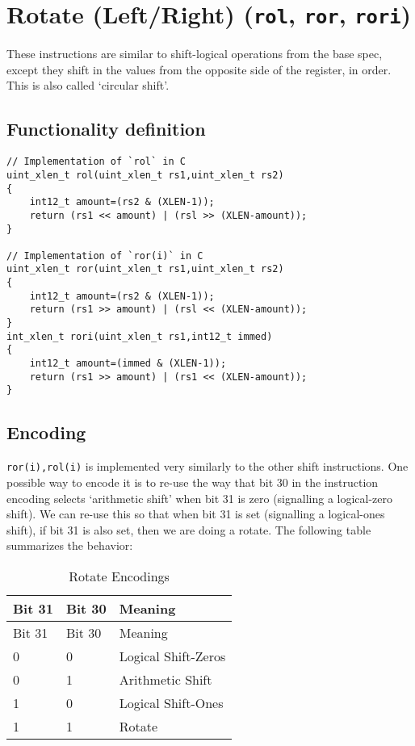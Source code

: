 
\section{Rotate (Left/Right) (\texttt{rol}, \texttt{ror}, \texttt{rori})}

These instructions are similar to shift-logical operations from the base
spec, except they shift in the values from the opposite side of the
register, in order. This is also called `circular shift'.

\subsection{Functionality definition}

\begin{verbatim}
// Implementation of `rol` in C
uint_xlen_t rol(uint_xlen_t rs1,uint_xlen_t rs2)
{
    int12_t amount=(rs2 & (XLEN-1));
    return (rs1 << amount) | (rsl >> (XLEN-amount));
}   

// Implementation of `ror(i)` in C
uint_xlen_t ror(uint_xlen_t rs1,uint_xlen_t rs2)
{
    int12_t amount=(rs2 & (XLEN-1));
    return (rs1 >> amount) | (rsl << (XLEN-amount));
}
int_xlen_t rori(uint_xlen_t rs1,int12_t immed)
{
    int12_t amount=(immed & (XLEN-1));
    return (rs1 >> amount) | (rs1 << (XLEN-amount));
}
\end{verbatim}

\subsection{Encoding}



\texttt{ror(i),rol(i)} is implemented very similarly to the other shift
instructions. One possible way to encode it is to re-use the way that
bit 30 in the instruction encoding selects `arithmetic shift' when bit
31 is zero (signalling a logical-zero shift). We can re-use this so that
when bit 31 is set (signalling a logical-ones shift), if bit 31 is also
set, then we are doing a rotate. The following table summarizes the
behavior:

\begin{longtable}[c]{@{}lll@{}}
\caption{Rotate Encodings}\tabularnewline
\toprule
Bit 31 & Bit 30 & Meaning\tabularnewline
\midrule
\endfirsthead
\toprule
Bit 31 & Bit 30 & Meaning\tabularnewline
\midrule
\endhead
0 & 0 & Logical Shift-Zeros\tabularnewline
0 & 1 & Arithmetic Shift\tabularnewline
1 & 0 & Logical Shift-Ones\tabularnewline
1 & 1 & Rotate\tabularnewline
\bottomrule
\end{longtable}

